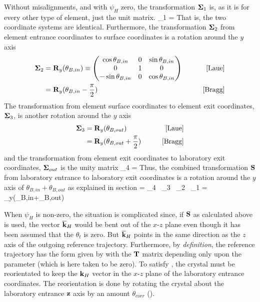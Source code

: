 Without misalignments, and with $\psi_H$ zero, the transformation
${\bf \Sigma}_1$ is, as it is for every other type of element,
just the unit matrix. 
\Begineq
  \Bf\Sigma_1 = \bfI
\Endeq
That is, the two coordinate systems are
identical. Furthermore, the transformation ${\bf \Sigma}_2$ from element
entrance coordinates to surface coordinates is a rotation around the $y$
axis
\begin{align}
  {\bf \Sigma}_2 &= {\bf R}_y(\theta_{B,in}) \equiv \begin{pmatrix}
     \cos\theta_{B,in} & 0 & \sin\theta_{B,in} \\
     0                 & 1 & 0                 \\
    -\sin\theta_{B,in} & 0 & \cos\theta_{B,in} \\
  \end{pmatrix}
  \qquad &\text{[Laue]}
  \label{mt0t010} \\
  &= {\bf R}_y(\theta_{B,in} - \frac{\pi}{2})
  \qquad &\text{[Bragg]} \nonumber
\end{align}
The transformation from element surface coordinates to element exit
coordinates, ${\bf \Sigma}_3$, is another rotation around the $y$ axis 
\begin{align}
  {\bf \Sigma}_3 &= {\bf R}_y(\theta_{B,out})
  \qquad &\text{[Laue]} \\
  &= {\bf R}_y(\theta_{B,out} + \frac{\pi}{2})
  \qquad &\text{[Bragg]} \nonumber
\end{align}
and the transformation from element exit coordinates
to laboratory exit coordinates, ${\bf \Sigma}_{out}$ is the unity matrix
\Begineq
  \Bf\Sigma_4 = \bfI
\Endeq
Thus, the combined transformation ${\bf S}$ from laboratory entrance to
laboratory exit coordinates is a rotation around the $y$ axis of
$\theta_{B,in}+\theta_{B,out}$ as explained in section
\Begineq
  \bfS = \Bf\Sigma_4 \, \Bf\Sigma_3 \, \Bf\Sigma_2 \, \Bf\Sigma_1 
  = \bfR_y(\theta_{B,in}+\theta_{B,out})
\Endeq

When $\psi_H$ is non-zero, the situation is complicated since, if
${\bf S}$ as calculated above is used, the vector $\overline{{\bf k}}_H$ would be
bent out of the $x$-$z$ plane even though it has been assumed that the
 $\theta_t$ is zero. But $\overline{{\bf k}}_H$ points in the same direction
as the $z$ axis of the outgoing reference trajectory. Furthermore, by
{\em definition}, the reference trajectory has the form given by
 with the ${\bf T}$ matrix depending only upon the 
parameter (which is here taken to be zero). To satisfy , the
crystal must be reorientated to keep the ${\bf k}_H$ vector in the
$x$-$z$ plane of the laboratory entrance coordinates.  The
reorientation is done by rotating the crystal about the laboratory
entrance ${\bf z}$ axis by an amount $\theta_{corr}$ ().

